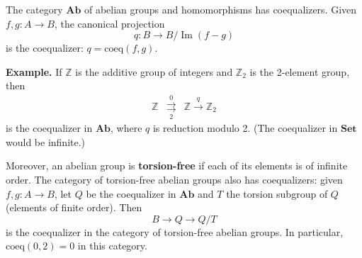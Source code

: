 The category $\mathbf{Ab}$ of abelian groups and homomorphisms has coequalizers. Given $f, g: A \to B$, the canonical projection
$$q: B \to B / \operatorname{Im}(f - g)$$
is the coequalizer: $q = \text{coeq}(f, g)$.

\textbf{Example.} If $\mathbb{Z}$ is the additive group of integers and $\mathbb{Z}_2$ is the 2-element group, then
\[
\begin{array}{ccc}
\mathbb{Z} & \mathrel{\mathop{\rightrightarrows}\limits_{2}^{0}} & \mathbb{Z} \xrightarrow{q} \mathbb{Z}_2
\end{array}
\]
is the coequalizer in $\mathbf{Ab}$, where $q$ is reduction modulo 2. (The coequalizer in $\mathbf{Set}$ would be infinite.)

Moreover, an abelian group is \textbf{torsion-free} if each of its elements is of infinite order. The category of torsion-free abelian groups also has coequalizers: given $f, g: A \to B$, let $Q$ be the coequalizer in $\mathbf{Ab}$ and $T$ the torsion subgroup of $Q$ (elements of finite order). Then
\[
B \to Q \to Q/T
\]
is the coequalizer in the category of torsion-free abelian groups. In particular, $\text{coeq}(0, 2) = 0$ in this category.
